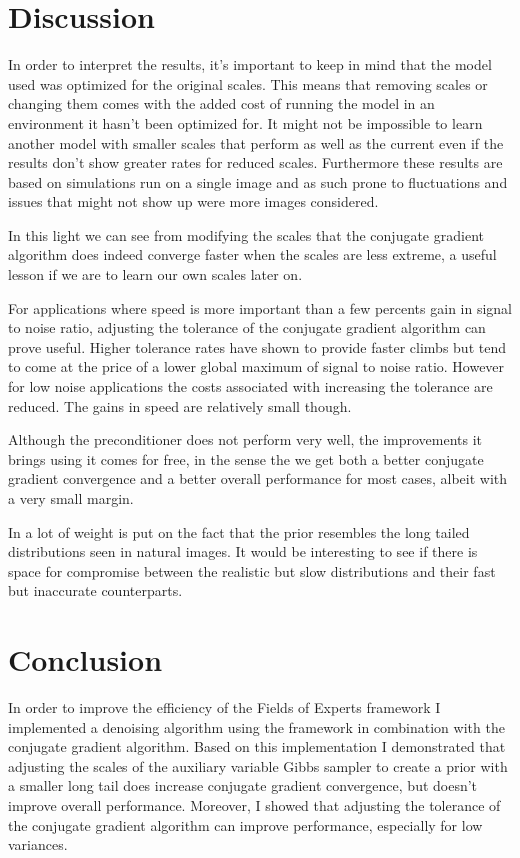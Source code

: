 \documentclass{article}
\begin{document}
\section{Discussion}

In order to interpret the results, it's important to keep in mind that 
the model used was optimized for the original scales. This means that 
removing scales or changing them comes with the added cost of running 
the model in an environment it hasn't been optimized for. It might not 
be impossible to learn another model with smaller scales that perform as 
well as the current even if the results don't show greater rates for 
reduced scales.  Furthermore these results are based on simulations run 
on a single image and as such prone to fluctuations and issues that 
might not show up were more images considered.

In this light we can see from modifying the scales that the conjugate 
gradient algorithm does indeed converge faster when the scales are less 
extreme, a useful lesson if we are to learn our own scales later on.  

For applications where speed is more important than a few percents gain 
in signal to noise ratio, adjusting the tolerance of the conjugate 
gradient algorithm can prove useful. Higher tolerance rates have shown 
to provide faster climbs but tend to come at the price of a lower global 
maximum of signal to noise ratio. However for low noise applications the 
costs associated with increasing the tolerance are reduced. The gains in 
speed are relatively small though.

Although the preconditioner does not perform very well, the improvements 
it brings using it comes for free, in the sense the we get both a better 
conjugate gradient convergence and a better overall performance for most 
cases, albeit with a very small margin.

In \citep{uwe} a lot of weight is put on the fact that the prior 
resembles the long tailed distributions seen in natural images. It would 
be interesting to see if there is space for compromise between the 
realistic but slow distributions and their fast but inaccurate 
counterparts.


\section{Conclusion}

In order to improve the efficiency of the Fields of Experts framework I 
implemented a denoising algorithm using the framework in combination 
with the conjugate gradient algorithm. Based on this implementation I 
demonstrated that adjusting the scales of the auxiliary variable Gibbs 
sampler to create a prior with a smaller long tail does increase 
conjugate gradient convergence, but doesn't improve overall performance.  
Moreover, I showed that adjusting the tolerance of the conjugate 
gradient algorithm can improve performance, especially for low 
variances.



\end{document}
